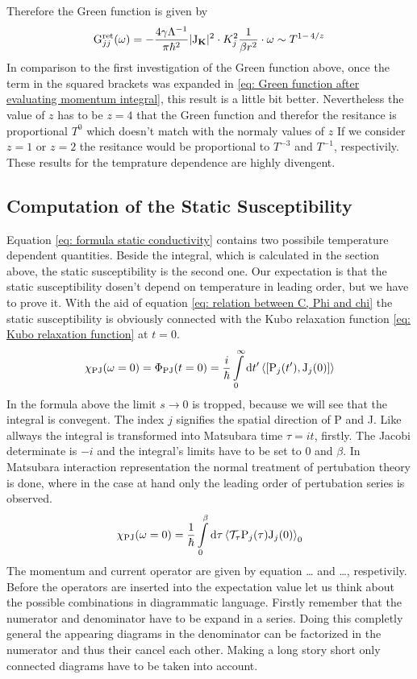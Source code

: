 Therefore the Green function is given by
%
\begin{align}
	\mt{G}_{jj}^{\mt{ret}}(\omega) 
	= 
	-\frac{4 \gamma \Lambda^{-1}}{\pi \hbar^{2}}
	\vert \mt{J}_{\vb{K}} \vert^{2} \cdot K_{j}^{2} 
	\frac{1}{\beta r^{2}} \cdot \omega
	\sim
	T^{1-\flatfrac{4}{z}}
\end{align}
%
In comparison to the first investigation of the Green function above, once the term in the squared brackets was expanded in \eqref{eq: Green function after evaluating momentum integral}, this result is a little bit better.
Nevertheless the value of $z$ has to be $z=4$ that the Green function and therefor the resitance is proportional $T^{0}$ which doesn't match with the normaly values of $z$
If we consider $z=1$ or $z=2$ the resitance would be proportional to $T^{-3}$ and $T^{-1}$, respectivily.
These results for the temprature dependence are highly divengent.
%
%
\subsection{Computation of the Static Susceptibility}
\label{subsec: static susceptibility}
%
%
Equation \eqref{eq: formula static conductivity} contains two possibile temperature dependent quantities.
Beside the integral, which is calculated in the section above, the static susceptibility is the second one.
Our expectation is that the static susceptibility dosen't depend on temperature in leading order, but we have to prove it.
With the aid of equation \eqref{eq: relation between C, Phi and chi} the static susceptibility is obviously connected with the Kubo relaxation function \eqref{eq: Kubo relaxation function} at $t=0$.
%
\begin{align}
	\chi_{\mt{PJ}}(\omega = 0) = \Phi_{\mt{PJ}}(t = 0) = \frac{i}{\hbar} \int\limits_{0}^{\infty} \dd{t'} \expval{\comm{\mt{P}_{j}(t')}{\mt{J}_{j}(0)}}
\end{align}
%
In the formula above the limit $s\to0$ is tropped, because we will see that the integral is convegent.
The index $j$ signifies the spatial direction of P and J.
Like allways the integral is transformed into Matsubara time $\tau = it$, firstly.
The Jacobi determinate is $-i$ and the integral's limits have to be set to $0$ and $\beta$.
In Matsubara interaction representation the normal treatment of pertubation theory is done, where in the case at hand only the leading order of pertubation series is observed.
%
\begin{align}
	\chi_{\mathrm{PJ}}(\omega = 0) = \frac{1}{\hbar} \int\limits_{0}^{\beta} \dd{\tau} \expval{\mathcal{T}_{\tau} \mathrm{P}_{j}(\tau) \mathrm{J}_{j}(0)}_{0}
\end{align}
%
The momentum and current operator are given by equation \dots{} and \dots{}, respetivily.
Before the operators are inserted into the expectation value let us think about the possible combinations in diagrammatic language.
Firstly remember that the numerator and denominator have to be expand in a series. 
Doing this completly general the appearing diagrams in the denominator can be factorized in the numerator and thus their cancel each other.
Making a long story short only connected diagrams have to be taken into account.

